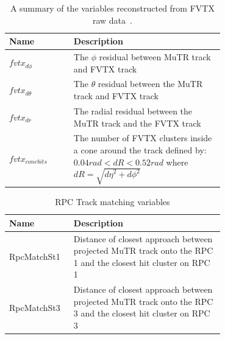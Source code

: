 \begin{table}[ht]
  \centering
  \begin{tabular}{l p{0.7\linewidth}}
    \toprule
    \textbf{Name} & \textbf{Description} \\
    \midrule
    $fvtx_{d\phi}$ & The $\phi$ residual between MuTR track and FVTX track \\
    $fvtx_{d\theta}$ & The $\theta$ residual between the MuTR track and FVTX track \\
    $fvtx_{dr}$ & The radial residual between the MuTR track and the FVTX track \\
    $fvtx_{conebits}$ & The number of FVTX clusters inside a cone around the track defined by: $0.04 rad < dR < 0.52 rad$ where $dR = \sqrt{{d\eta}^2+{d\phi}^2}$\\
    \bottomrule
  \end{tabular}
  \caption{A summary of the variables reconstructed from FVTX raw data~\cite{Meles2015}.}
  \label{tab:fvtx_variables}
\end{table}

\begin{table}[ht]
  \centering
  \begin{tabular}{l p{0.7\linewidth}}
    \toprule
    \textbf{Name} & \textbf{Description} \\
    \midrule
    RpcMatchSt1 & Distance of closest approach between projected MuTR track onto the RPC 1 and the closest hit cluster on RPC 1\\
    RpcMatchSt3 & Distance of closest approach between projected MuTR track onto the RPC 3 and the closest hit cluster on RPC 3\\
    \bottomrule
  \end{tabular}
  \caption{RPC Track matching variables}
  \label{tab:rpc_variables}
\end{table}

